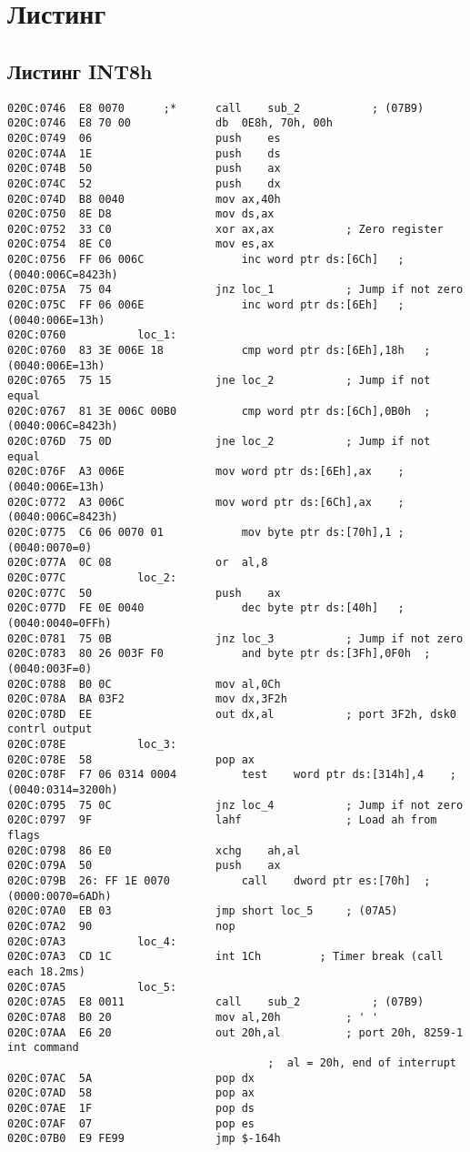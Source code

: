 \section*{Листинг}
\subsection*{Листинг INT8h} 
\begin{lstlisting}[style={asm}]
020C:0746  E8 0070		;*		call	sub_2			; (07B9)
020C:0746  E8 70 00				db	0E8h, 70h, 00h
020C:0749  06					push	es
020C:074A  1E					push	ds
020C:074B  50					push	ax
020C:074C  52					push	dx
020C:074D  B8 0040				mov	ax,40h
020C:0750  8E D8				mov	ds,ax
020C:0752  33 C0				xor	ax,ax			; Zero register
020C:0754  8E C0				mov	es,ax
020C:0756  FF 06 006C				inc	word ptr ds:[6Ch]	; (0040:006C=8423h)
020C:075A  75 04				jnz	loc_1			; Jump if not zero
020C:075C  FF 06 006E				inc	word ptr ds:[6Eh]	; (0040:006E=13h)
020C:0760			loc_1:
020C:0760  83 3E 006E 18			cmp	word ptr ds:[6Eh],18h	; (0040:006E=13h)
020C:0765  75 15				jne	loc_2			; Jump if not equal
020C:0767  81 3E 006C 00B0			cmp	word ptr ds:[6Ch],0B0h	; (0040:006C=8423h)
020C:076D  75 0D				jne	loc_2			; Jump if not equal
020C:076F  A3 006E				mov	word ptr ds:[6Eh],ax	; (0040:006E=13h)
020C:0772  A3 006C				mov	word ptr ds:[6Ch],ax	; (0040:006C=8423h)
020C:0775  C6 06 0070 01			mov	byte ptr ds:[70h],1	; (0040:0070=0)
020C:077A  0C 08				or	al,8
020C:077C			loc_2:
020C:077C  50					push	ax
020C:077D  FE 0E 0040				dec	byte ptr ds:[40h]	; (0040:0040=0FFh)
020C:0781  75 0B				jnz	loc_3			; Jump if not zero
020C:0783  80 26 003F F0			and	byte ptr ds:[3Fh],0F0h	; (0040:003F=0)
020C:0788  B0 0C				mov	al,0Ch
020C:078A  BA 03F2				mov	dx,3F2h
020C:078D  EE					out	dx,al			; port 3F2h, dsk0 contrl output
020C:078E			loc_3:
020C:078E  58					pop	ax
020C:078F  F7 06 0314 0004			test	word ptr ds:[314h],4	; (0040:0314=3200h)
020C:0795  75 0C				jnz	loc_4			; Jump if not zero
020C:0797  9F					lahf				; Load ah from flags
020C:0798  86 E0				xchg	ah,al
020C:079A  50					push	ax
020C:079B  26: FF 1E 0070			call	dword ptr es:[70h]	; (0000:0070=6ADh)
020C:07A0  EB 03				jmp	short loc_5		; (07A5)
020C:07A2  90					nop
020C:07A3			loc_4:
020C:07A3  CD 1C				int	1Ch			; Timer break (call each 18.2ms)
020C:07A5			loc_5:
020C:07A5  E8 0011				call	sub_2			; (07B9)
020C:07A8  B0 20				mov	al,20h			; ' '
020C:07AA  E6 20				out	20h,al			; port 20h, 8259-1 int command
										;  al = 20h, end of interrupt
020C:07AC  5A					pop	dx
020C:07AD  58					pop	ax
020C:07AE  1F					pop	ds
020C:07AF  07					pop	es
020C:07B0  E9 FE99				jmp	$-164h
\end{lstlisting}
\newpage


